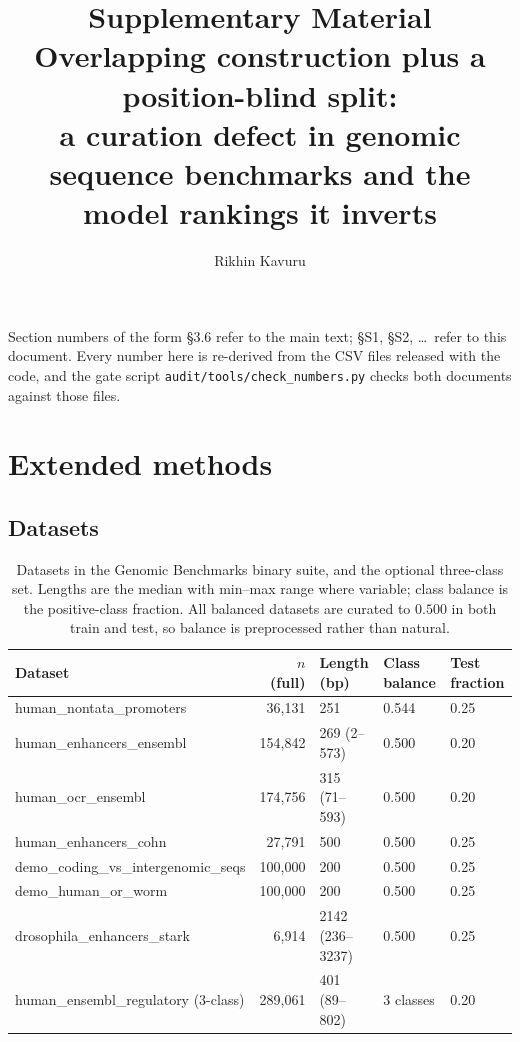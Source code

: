 \documentclass[11pt,a4paper]{article}
\title{Supplementary Material\\[3pt]
\large Overlapping construction plus a position-blind split:\\
a curation defect in genomic sequence benchmarks and the model rankings it inverts}
\author{Rikhin Kavuru}
\date{}
\begin{document}
\maketitle

\noindent Section numbers of the form \S3.6 refer to the main text; \S S1, \S S2, \dots\ refer to
this document. Every number here is re-derived from the CSV files released with the code, and the
gate script \texttt{audit/tools/check\_numbers.py} checks both documents against those files.

\tableofcontents

\section{Extended methods}\label{sec:s-methods}

\subsection{Datasets}\label{sec:s-data}

\begin{table}[htbp]
\centering
\caption{Datasets in the Genomic Benchmarks binary suite, and the optional three-class set.
Lengths are the median with min--max range where variable; class balance is the positive-class
fraction. All balanced datasets are curated to $0.500$ in both train and test, so balance is
preprocessed rather than natural.}\label{tab:datasets}
\footnotesize\setlength{\tabcolsep}{6pt}
\begin{tabular}{@{}lrlll@{}}
\toprule
Dataset & $n$ (full) & Length (bp) & Class balance & Test fraction\\
\midrule
human\_nontata\_promoters            & 36{,}131  & 251              & 0.544 & 0.25\\
human\_enhancers\_ensembl            & 154{,}842 & 269 (2--573)     & 0.500 & 0.20\\
human\_ocr\_ensembl                  & 174{,}756 & 315 (71--593)    & 0.500 & 0.20\\
human\_enhancers\_cohn               & 27{,}791  & 500              & 0.500 & 0.25\\
demo\_coding\_vs\_intergenomic\_seqs & 100{,}000 & 200              & 0.500 & 0.25\\
demo\_human\_or\_worm                & 100{,}000 & 200              & 0.500 & 0.25\\
drosophila\_enhancers\_stark         & 6{,}914   & 2142 (236--3237) & 0.500 & 0.25\\
\midrule
human\_ensembl\_regulatory (3-class) & 289{,}061 & 401 (89--802)    & 3 classes & 0.20\\
\bottomrule
\end{tabular}
\end{table}
\end{document}
